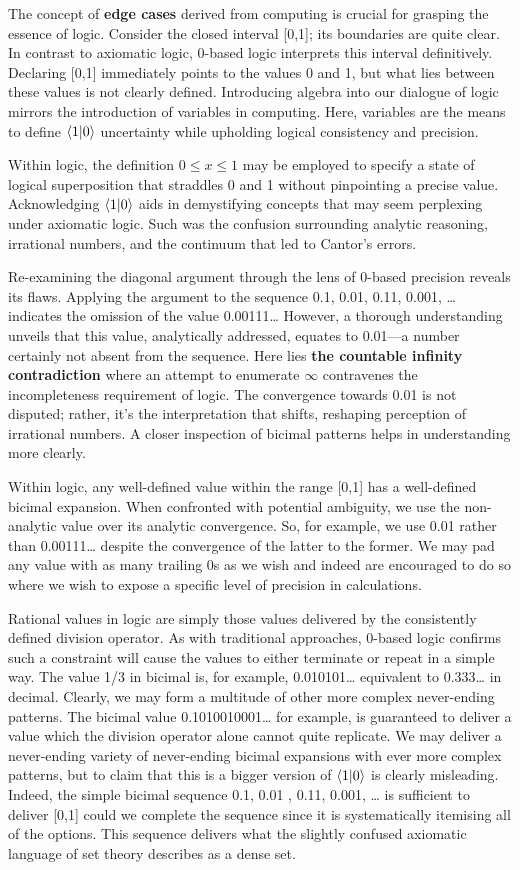 \documentclass{article}
\begin{document}
The concept of \textbf{edge cases} derived from computing is crucial for grasping the essence of logic. Consider the closed interval [0,1]; its boundaries are quite clear. In contrast to axiomatic logic, 0-based logic interprets this interval definitively. Declaring [0,1] immediately points to the values 0 and 1, but what lies between these values is not clearly defined. Introducing algebra into our dialogue of logic mirrors the introduction of variables in computing. Here, variables are the means to define $\langle 1 | 0 \rangle$ uncertainty while upholding logical consistency and precision.

Within logic, the definition \( 0 \le x \le 1 \) may be employed to specify a state of logical superposition that straddles 0 and 1 without pinpointing a precise value. Acknowledging $\langle 1 | 0 \rangle$ aids in demystifying concepts that may seem perplexing under axiomatic logic. Such was the confusion surrounding analytic reasoning, irrational numbers, and the continuum that led to Cantor's errors.

Re-examining the diagonal argument through the lens of 0-based precision reveals its flaws. Applying the argument to the sequence 0.1, 0.01, 0.11, 0.001, … indicates the omission of the value 0.00111… However, a thorough understanding unveils that this value, analytically addressed, equates to 0.01—a number certainly not absent from the sequence. Here lies \textbf{the countable infinity contradiction} where an attempt to enumerate $\infty$ contravenes the incompleteness requirement of logic. The convergence towards 0.01 is not disputed; rather, it's the interpretation that shifts, reshaping perception of irrational numbers. A closer inspection of bicimal patterns helps in understanding more clearly.

Within logic, any well-defined value within the range [0,1] has a well-defined bicimal expansion. When confronted with potential ambiguity, we use the non-analytic value over its analytic convergence. So, for example, we use 0.01 rather than 0.00111… despite the convergence of the latter to the former. We may pad any value with as many trailing 0s as we wish and indeed are encouraged to do so where we wish to expose a specific level of precision in calculations.

Rational values in logic are simply those values delivered by the consistently defined division operator. As with traditional approaches, 0-based logic confirms such a constraint will cause the values to either terminate or repeat in a simple way. The value 1/3 in bicimal is, for example, 0.010101… equivalent to 0.333… in decimal. Clearly, we may form a multitude of other more complex never-ending patterns. The bicimal value 0.1010010001… for example, is guaranteed to deliver a value which the division operator alone cannot quite replicate. We may deliver a never-ending variety of never-ending bicimal expansions with ever more complex patterns, but to claim that this is a bigger version of $\langle 1 | 0 \rangle$ is clearly misleading. Indeed, the simple bicimal sequence 0.1, 0.01 , 0.11, 0.001, … is sufficient to deliver [0,1] could we complete the sequence since it is systematically itemising all of the options. This sequence delivers what the slightly confused axiomatic language of set theory describes as a dense set.
\end{document}
